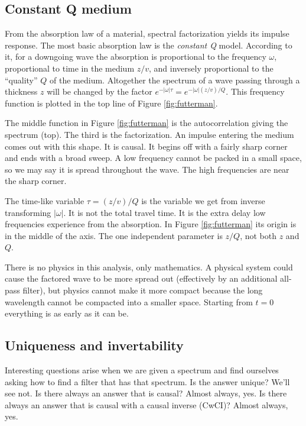 \subsection{Constant Q medium}
From the absorption law of a material, spectral factorization yields its impulse response.
The most basic absorption law is the {\em constant Q} model.
According to it, for a downgoing wave
the absorption is proportional to the frequency $\omega$,
proportional to time in the medium $z/v$,
and inversely proportional to the ``quality'' $Q$ of the medium.
Altogether the spectrum of a wave passing through a thickness $z$ will be changed by the factor
$ e^{-|\omega|\tau} = e^{-|\omega|(z/v)/Q} $.
This frequency function is plotted in the top line of Figure \ref{fig:futterman}.

\par
The middle function in Figure \ref{fig:futterman}
is the autocorrelation giving the spectrum (top).
The third is the factorization.
An impulse entering the medium comes out with this shape.
It is causal.
It begins off with a fairly sharp corner and ends with a broad sweep.
A low frequency cannot be packed in a small space,
so we may say it is spread throughout the wave.
The high frequencies are near the sharp corner.

\par
The time-like variable $\tau=(z/v)/Q$ is the variable we get from inverse transforming $|\omega|$.
It is not the total travel time.
It is the extra delay low frequencies experience from the absorption.
In Figure \ref{fig:futterman} its origin is in the middle of the axis.
The one independent parameter is $z/Q$, not both $z$ and $Q$.


\par
There is no physics in this analysis, only mathematics.
A physical system could cause the factored wave to be more spread out
(effectively by an additional all-pass filter),
but physics cannot make it more compact
because the long wavelength cannot be compacted into a smaller space.
Starting from $t=0$ everything is as early as it can be.

\subsection{Uniqueness and invertability}
Interesting questions arise when we are given a spectrum
and find ourselves asking how to find a filter that has that spectrum.
Is the answer unique?  We'll see not.
Is there always an answer that is causal?
Almost always, yes.
Is there always an answer that is causal with a causal inverse (CwCI)?
Almost always, yes.

